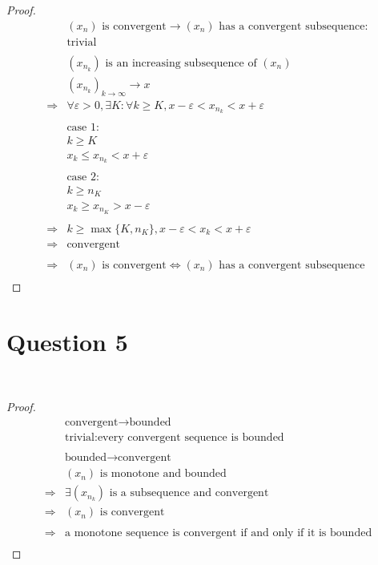 \documentclass{article}
\begin{document}
\begin{proof}
    \begin{align*}
        &(x_n)\text{ is convergent}\to(x_n)\text{ has a convergent subsequence}:\\
        &\text{trivial}\\
        &\\
        &(x_{n_k})\text{ is an increasing subsequence of }(x_n)\\
        &(x_{n_k})_{k\to\infty}\to x\\
        \Rightarrow&\forall \varepsilon >0,\exists K:\forall k\geqslant K,x-\varepsilon<x_{n_k}<x+\varepsilon\\
        &\\
        &\text{case 1}:\\
        &k\geqslant K\\
        &x_k\leqslant x_{n_k}<x+\varepsilon\\
        &\\
        &\text{case 2}:\\
        &k\geqslant n_K\\
        &x_k\geqslant x_{n_K}>x-\varepsilon\\
        &\\
        \Rightarrow&k\geqslant\max\{K,n_K\},x-\varepsilon<x_k<x+\varepsilon\\
        \Rightarrow&\text{convergent}\\
        &\\
        \Rightarrow&(x_n)\text{ is convergent}\Leftrightarrow(x_n)\text{ has a convergent subsequence}\\
    \end{align*}
\end{proof}

\newpage

\section*{Question 5}

~

\begin{proof}
    \begin{align*}
        &\text{convergent}\to\text{bounded}\\
        &\text{trivial}:\text{every convergent sequence is bounded}\\
        &\\
        &\text{bounded}\to\text{convergent}\\
        &(x_n)\text{ is monotone and bounded}\\
        \Rightarrow&\exists (x_{n_k})\text{ is a subsequence and convergent}\\
        \Rightarrow&(x_n)\text{ is convergent}\\
        &\\
        \Rightarrow&\text{a monotone sequence is convergent if and only if it is bounded}\\
    \end{align*}
\end{proof}
\end{document}
